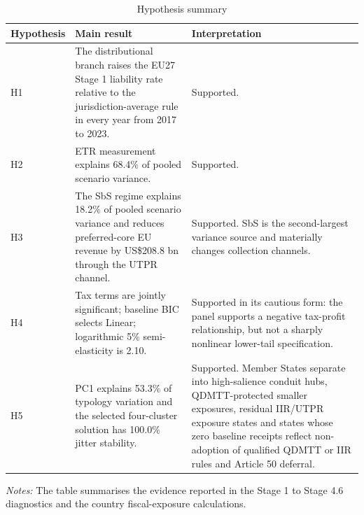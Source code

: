 \begin{table}[H]
\centering
\small
\setlength{\tabcolsep}{4pt}
\caption[Hypothesis summary]{Hypothesis summary}
\label{tab:hypothesis_result_summary}
\begin{tabular}{@{}L{1.7cm}L{7.1cm}L{4.8cm}@{}}
\toprule
Hypothesis & Main result & Interpretation \\
\midrule
H1 & The distributional branch raises the EU27 Stage 1 liability rate relative to the jurisdiction-average rule in every year from 2017 to 2023. & Supported. \\
H2 & ETR measurement explains 68.4\% of pooled scenario variance. & Supported. \\
H3 & The SbS regime explains 18.2\% of pooled scenario variance and reduces preferred-core EU revenue by US\$208.8 bn through the UTPR channel. & Supported. SbS is the second-largest variance source and materially changes collection channels. \\
H4 & Tax terms are jointly significant; baseline BIC selects Linear; logarithmic 5\% semi-elasticity is 2.10. & Supported in its cautious form: the panel supports a negative tax-profit relationship, but not a sharply nonlinear lower-tail specification. \\
H5 & PC1 explains 53.3\% of typology variation and the selected four-cluster solution has 100.0\% jitter stability. & Supported. Member States separate into high-salience conduit hubs, QDMTT-protected smaller exposures, residual IIR/UTPR exposure states and states whose zero baseline receipts reflect non-adoption of qualified QDMTT or IIR rules and Article 50 deferral. \\
\bottomrule
\end{tabular}

\vspace{0.35em}
\noindent\begin{minipage}{\textwidth}
\footnotesize\raggedright\textit{Notes:} The table summarises the evidence reported in the Stage 1 to Stage 4.6 diagnostics and the country fiscal-exposure calculations.
\end{minipage}
\end{table}
